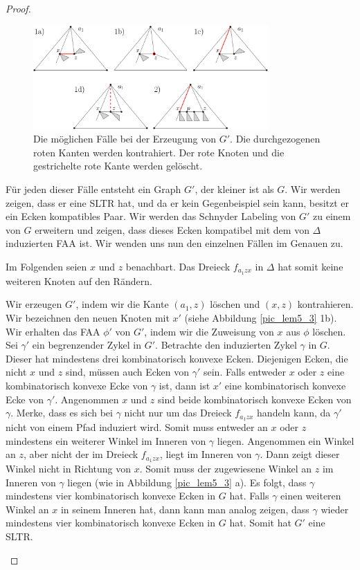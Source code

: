\begin{proof}
\begin{figure}
	\centering
	  \includegraphics[width=0.8\textwidth]{lem5_2.png}
    	\caption{Die möglichen Fälle bei der Erzeugung von $G'$. Die durchgezogenen roten Kanten werden kontrahiert. Der rote Knoten und die gestrichelte rote Kante werden gelöscht.}
    	\label{pic_lem5_2}
\end{figure}

Für jeden dieser Fälle entsteht ein Graph $G'$, der kleiner ist als $G$. Wir werden zeigen, dass er eine SLTR hat, und da er kein Gegenbeispiel sein kann, besitzt er ein Ecken kompatibles Paar. Wir werden das Schnyder Labeling von $G'$ zu einem von $G$ erweitern und zeigen, dass dieses Ecken kompatibel mit dem von $\Delta$ induzierten FAA ist. Wir wenden uns nun den einzelnen Fällen im Genauen zu. 

Im Folgenden seien $x$ und $z$ benachbart. Das Dreieck $f_{a_1zx}$ in $\Delta$ hat somit keine weiteren Knoten auf den Rändern.
\begin{description}[leftmargin =0pt, font = \rmfamily ]
\item[Fall 1a:] Wir erzeugen $G'$, indem wir die Kante $(a_1,z)$ löschen und $(x,z)$ kontrahieren. Wir bezeichnen den neuen Knoten mit $x'$ (siehe Abbildung \ref{pic_lem5_3} 1b). Wir erhalten das FAA $\phi'$ von $G'$, indem wir die Zuweisung von $x$ aus $\phi$ löschen. Sei $\gamma'$ ein begrenzender Zykel in $G'$. Betrachte den induzierten Zykel $\gamma$ in $G$. Dieser hat mindestens drei kombinatorisch konvexe Ecken. Diejenigen Ecken, die nicht $x$ und $z$ sind, müssen auch Ecken von $\gamma'$ sein. Falls entweder $x$ oder $z$ eine kombinatorisch konvexe Ecke von $\gamma$ ist, dann ist $x'$ eine kombinatorisch konvexe Ecke von $\gamma'$. Angenommen $x$ und $z$ sind beide kombinatorisch konvexe Ecken von $\gamma$. Merke, dass es sich bei $\gamma$ nicht nur um das Dreieck $f_{a_1zx}$ handeln kann, da $\gamma'$ nicht von einem Pfad induziert wird. Somit muss entweder an $x$ oder $z$ mindestens ein weiterer Winkel im Inneren von $\gamma$ liegen. Angenommen ein Winkel an $z$, aber nicht der im Dreieck $f_{a_1zx}$, liegt im Inneren von $\gamma$. Dann zeigt dieser Winkel nicht in Richtung von $x$. Somit muss der zugewiesene Winkel an $z$ im Inneren von $\gamma$ liegen (wie in Abbildung \ref{pic_lem5_3} a). Es folgt, dass $\gamma$ mindestens vier kombinatorisch konvexe Ecken in $G$ hat. Falls $\gamma$ einen weiteren Winkel an $x$ in seinem Inneren hat, dann kann man analog zeigen, dass $\gamma$ wieder mindestens vier kombinatorisch konvexe Ecken in $G$ hat. Somit hat $G'$ eine SLTR.


\end{description}
\end{proof}
